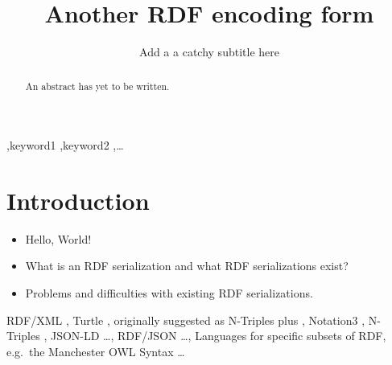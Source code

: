 \documentclass[sw]{iosart2c}
\begin{document}
\begin{frontmatter}

\title{Another RDF encoding form}
\subtitle{Add a a catchy subtitle here}


\author{ }%
\address{Verbundzentrale des GBV (VZG), Platz der G\"ottinger Sieben 1, 37073 G\"ottingen, Germany}
\runningauthor{}

\begin{abstract}
    An abstract has yet to be written.
\end{abstract}

\begin{keyword}
 \sep keyword1
 \sep keyword2
 \sep \ldots
\end{keyword}

\end{frontmatter}


\section{Introduction}\label{introduction}

\begin{itemize}
    \item Hello, World!
    \item What is an RDF serialization and what RDF serializations exist?
    \item Problems and difficulties with existing RDF serializations.
\end{itemize}


RDF/XML \cite{Beckett2004},
Turtle \cite{Prudhommeaux2013}, 
originally suggested as N-Triples plus \cite{Beckett2003},
Notation3 \cite{BernersLee2011},
N-Triples \cite{Beckett2001},
JSON-LD \ldots,
RDF/JSON \ldots,
Languages for specific subsets of RDF, e.g.\ the Manchester OWL Syntax
\ldots


%
\end{document}
